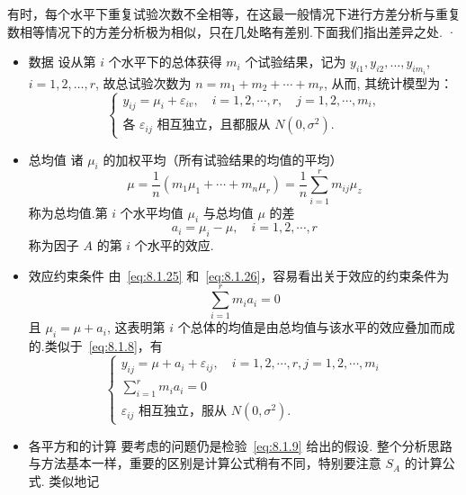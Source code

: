 有时，每个水平下重复试验次数不全相等，在这最一般情况下进行方差分析与重复数相等情况下的方差分析极为相似，只在几处略有差别.下面我们指出差异之处.
·
\begin{itemize}
  \item 数据
  设从第 $i$ 个水平下的总体获得 $m_i$ 个试验结果，记为 $y_{i1}, y_{i2}, \ldots, y_{im_{i}}$, $i=1,2,\ldots,r$, 故总试验次数为 $n=m_1+m_2+\cdots+m_r$, 从而, 其统计模型为：
  \begin{equation}\label{eq:8.1.24}
    \begin{cases}
      y_{i j}=\mu_{i}+\varepsilon_{i v}, \quad i=1,2, \cdots, r, \quad j=1,2, \cdots, m_{i},\\
      \text{各 $\varepsilon_{ij}$ 相互独立，且都服从 $N(0,\sigma^2)$}.
    \end{cases}
  \end{equation}
  \item 总均值
  诸 $\mu_i$ 的加权平均（所有试验结果的均值的平均）
  \begin{equation}\label{eq:8.1.25}
    \mu=\frac{1}{n}\left(m_{1} \mu_{1}+\cdots+m_{n} \mu_{r}\right)=\frac{1}{n} \sum_{i=1}^{r} m_{i j} \mu_{z}
  \end{equation}
  称为总均值.第 $i$ 个水平均值 $\mu_i$ 与总均值 $\mu$ 的差
  \begin{equation}\label{eq:8.1.26}
    a_{i}=\mu_{i}-\mu, \quad i=1,2, \cdots, r
  \end{equation}
  称为因子 $A$ 的第 $i$ 个水平的效应.
  \item 效应约束条件
  由~\eqref{eq:8.1.25} 和~\eqref{eq:8.1.26}，容易看出关于效应的约束条件为
  \begin{equation*}
    \sum_{i=1}^{r} m_{i} a_{i}=0
  \end{equation*}
  且 $\mu_i = \mu + a_i$, 这表明第 $i$ 个总体的均值是由总均值与该水平的效应叠加而成的.类似于~\eqref{eq:8.1.8}，有
  \begin{equation}\label{eq:8.1.27}
    \begin{cases}
      y_{i j}=\mu+a_{i}+\varepsilon_{i j}, \quad i=1,2, \cdots, r, j=1,2, \cdots, m_{i}\\
      \sum_{i=1}^{r} m_{i} a_{i}=0\\
      \text{$\varepsilon_{ij}$ 相互独立，服从 $N(0,\sigma^2)$}.
    \end{cases}
  \end{equation}
  \item 各平方和的计算
  要考虑的问题仍是检验~\eqref{eq:8.1.9} 给出的假设. 整个分析思路与方法基本一样，重要的区别是计算公式稍有不同，特别要注意 $S_A$ 的计算公式. 类似地记

\end{itemize}
